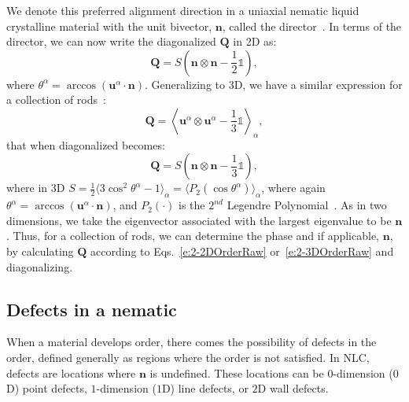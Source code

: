 We denote this preferred alignment direction in a uniaxial nematic liquid crystalline material with the unit bivector, $\mathbf{n}$, called the director~\cite{RN33}.
In terms of the director, we can now write the diagonalized $\mathbf{Q}$ in 2D as:
\begin{equation}
  \mathbf{Q} = S \left ( \mathbf{n} \otimes \mathbf{n} - \frac{1}{2}\mathbb{1} \right ),\label{e:2-2DOrderDiag}
\end{equation}
where $\theta^{\alpha} = \arccos (\mathbf{u}^{\alpha} \cdot \mathbf{n})$.
Generalizing to 3D, we have a similar expression for a collection of rods~\cite{RN33}:
\begin{equation}
  \mathbf{Q} =  \left \langle \mathbf{u}^{\alpha} \otimes \mathbf{u}^{\alpha} - \frac{1}{3} \mathbb{1} \right \rangle_{\alpha},\label{e:2-3DOrderRaw}
\end{equation}
that when diagonalized becomes:
\begin{equation}
  \mathbf{Q} = S \left ( \mathbf{n} \otimes \mathbf{n} - \frac{1}{3}\mathbb{1} \right ),\label{e:2-3DOrderDiag}
\end{equation}
where in 3D $S = \frac{1}{2} \big \langle 3 \cos^2 \theta^{\alpha}  - 1 \big  \rangle_{\alpha} = \big \langle P_2(\cos \theta^{\alpha}) \big \rangle_{\alpha} $,
where again $\theta^{\alpha} = \arccos (\mathbf{u}^{\alpha} \cdot \mathbf{n})$, and $P_2(\cdot)$ is the $2^{nd}$ Legendre Polynomial~\cite{RN33}.
As in two dimensions, we take the eigenvector associated with the largest eigenvalue to be $\mathbf{n}$.
Thus, for a collection of rods, we can determine the phase and if applicable, $\mathbf{n}$, by calculating $\mathbf{Q}$ according to Eqs.~\ref{e:2-2DOrderRaw} or~\ref{e:2-3DOrderRaw} and diagonalizing.


\subsection{Defects in a nematic}
When a material develops order, there comes the possibility of defects in the order, defined generally as regions where the order is not satisfied.
In NLC, defects are locations where $\mathbf{n}$ is undefined.
These locations can be $0$-dimension ($0$D) point defects, $1$-dimension ($1$D) line defects, or $2$D wall defects. \\

